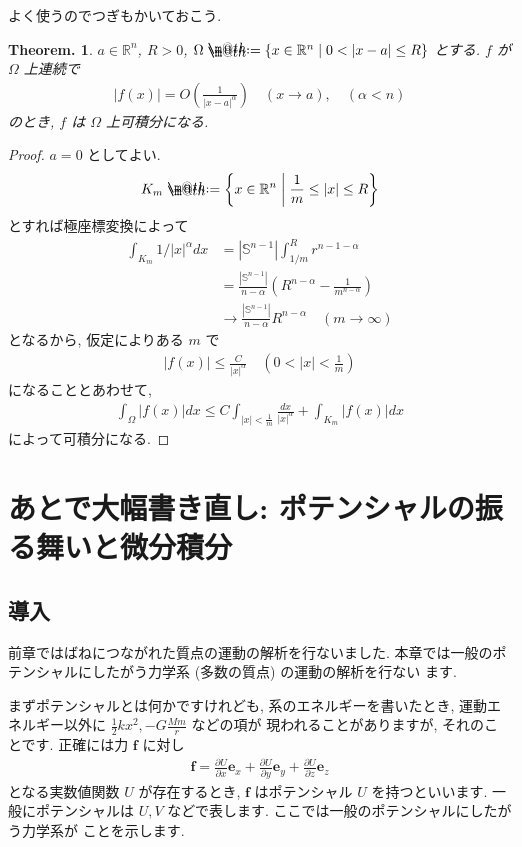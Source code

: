 \documentclass[openany, a4paper, oneside]{jsbook}
\makeatletter
\newcommand*{\defeq}{\mathrel{\rlap{%
\raisebox{0.3ex}{$\m@th\cdot$}}%
\raisebox{-0.3ex}{$\m@th\cdot$}}%
=}
\theoremstyle{break}
\theoremstyle{breakdefn}
\newtheorem{thm}{Theorem.}[section]
\newcommand{\abs}[1]{\left|#1\right|}
\newcommand{\rbk}[1]{\left (#1\right)}
\newcommand{\relmiddle}[1]{\mathrel{}\middle#1\mathrel{}}
\newcommand{\set}[2]{\left\{#1 \relmiddle| #2\right\}}
\newcommand{\bbR}{\mathbb{R}}
\newcommand{\bbRn}{\mathbb{R}^n}
\makeatother
\begin{document}
よく使うのでつぎもかいておこう.
\begin{thm}
$a \in \mathbb{R}^n$, $R > 0$, $\Omega \defeq \set{x \in \bbRn}{0 < \abs{x - a} \le R}$ とする.
$f$ が $\Omega$ 上連続で
\begin{align}
 \abs{f(x)}
 =
 O \rbk{\frac{1}{\abs{x - a}^{\alpha}}} \quad (x \to a), \quad (\alpha < n)
\end{align}
のとき, $f$ は $\Omega$ 上可積分になる.
\end{thm}
\begin{proof}
$a=0$ としてよい.
\begin{align}
 K_m
 \defeq
 \set{x \in \bbR^n}{\frac{1}{m} \le \abs{x} \le R}
\end{align}
とすれば極座標変換によって
\begin{align}
 \int_{K_m} 1/{|x|^{\alpha}} dx
 &=
 \abs{\mathbb{S}^{n-1}} \int_{1/m}^R r^{n-1-\alpha} \\
 &=
 \frac{\abs{\mathbb{S}^{n-1}}}{n - \alpha} \rbk{R^{n-\alpha} - \frac{1}{m^{n-\alpha}}} \\
 &\to
 \frac{\abs{\mathbb{S}^{n-1}}}{n-\alpha} R^{n-\alpha} \quad (m \to \infty)
\end{align}
となるから, 仮定によりある $m$ で
\begin{align}
 \abs{f(x)}
 \le
 \frac{C}{\abs{x}^{\alpha}} \quad \rbk{0 < \abs{x} < \frac{1}{m}}
\end{align}
になることとあわせて,
\begin{align}
 \int_{\Omega} \abs{f(x)} dx
 \le
 C \int_{\abs{x} < \frac{1}{m}} \frac{dx}{\abs{x}^{\alpha}} + \int_{K_m} \abs{f(x)} dx
\end{align}
によって可積分になる.
\end{proof}
\chapter{あとで大幅書き直し: ポテンシャルの振る舞いと微分積分}

\section{導入}


前章ではばねにつながれた質点の運動の解析を行ないました.
本章では一般のポテンシャルにしたがう力学系 (多数の質点) の運動の解析を行ない
ます.

まずポテンシャルとは何かですけれども,
系のエネルギーを書いたとき, 運動エネルギー以外に
$\frac{1}{2}kx^2,-G\frac{Mm}{r}$ などの項が
現われることがありますが, それのことです.
正確には力 $\bm{f}$ に対し
\begin{align}
\bm{f} =
\frac{ \partial U }{\partial x}\bm{e}_{x} + \frac{ \partial U}{\partial y}\bm{e}_{y} +
\frac{ \partial U}{\partial z}\bm{e}_{z}
\end{align}
となる実数値関数 $U$ が存在するとき,  $\bm{f}$ はポテンシャル $U$ を持つといいます.
一般にポテンシャルは $U,V$ などで表します.
ここでは一般のポテンシャルにしたがう力学系が
ことを示します.
\end{document}
